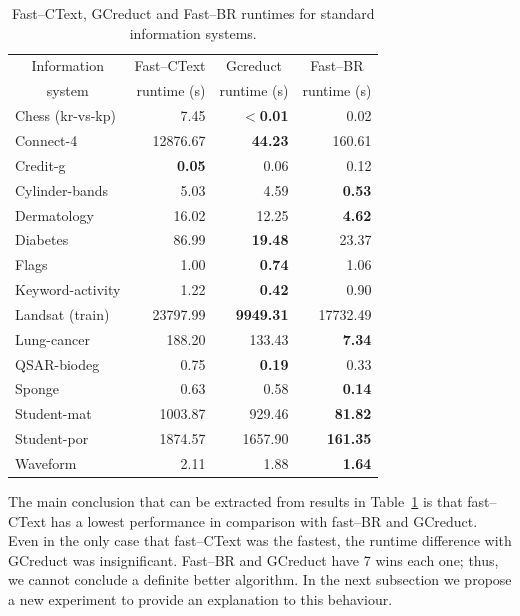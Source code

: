 \documentclass[authoryear,preprint,review,12pt]{elsarticle}
\begin{document}
	\begin{table}[!htb]
		\centering
		\caption{Fast--CText, GCreduct and Fast--BR runtimes for standard information systems.}
		\label{tab:java}
		\begin{tabular}{|l|r|r|r|}
			\hline
			\multicolumn{1}{|c|}{Information}  & Fast--CText & \multicolumn{1}{c|}{Gcreduct} & \multicolumn{1}{c|}{Fast--BR}  \\
			\multicolumn{1}{|c|}{system}       & runtime (s) & runtime (s)  & runtime (s)  \\
			\hline
			Chess (kr-vs-kp)          & 7.45          & \textbf{$<$0.01} & 0.02            \\
			Connect-4                 & 12876.67      & \textbf{44.23}   & 160.61          \\
			Credit-g                  & \textbf{0.05} & 0.06             & 0.12            \\
			Cylinder-bands            & 5.03          & 4.59             & \textbf{0.53}   \\
			Dermatology               & 16.02         & 12.25            & \textbf{4.62}   \\
			Diabetes                  & 86.99         & \textbf{19.48}   & 23.37           \\
			Flags                     & 1.00          & \textbf{0.74}    & 1.06            \\
			Keyword-activity          & 1.22          & \textbf{0.42}    & 0.90            \\
			Landsat (train)           & 23797.99      & \textbf{9949.31} & 17732.49        \\
			Lung-cancer               & 188.20        & 133.43           & \textbf{7.34}   \\
			QSAR-biodeg               & 0.75          & \textbf{0.19}    & 0.33            \\
			Sponge                    & 0.63          & 0.58             & \textbf{0.14}   \\
 			Student-mat               & 1003.87       & 929.46           & \textbf{81.82}  \\
			Student-por               & 1874.57       & 1657.90          & \textbf{161.35} \\
			Waveform                  & 2.11          & 1.88             & \textbf{1.64}   \\
			\hline
		\end{tabular}
	\end{table}

    The main conclusion that can be extracted from results in Table~\ref{tab:java} is that fast--CText has a lowest performance in comparison with fast--BR and GCreduct. Even in the only case that fast--CText was the fastest, the runtime difference with GCreduct was insignificant. Fast--BR and GCreduct have 7 wins each one; thus, we cannot conclude a definite better algorithm. In the next subsection we propose a new experiment to provide an explanation to this behaviour.	
	
\end{document}
